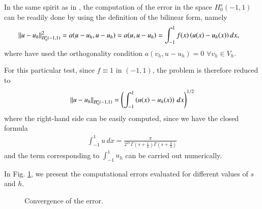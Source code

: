 In the same spirit as in \cite{acosta2017short}, the computation of the error in the space $H_0^s(-1,1)$ can be readily done by using the definition of the bilinear form, namely
\begin{align*}
	{\left\|u-u_h\right\|}_{H_0^s(-1,1)}^2 &=a(u-u_h,u-u_h) =a(u,u-u_h) =\int_{-1}^1f(x)\left(u(x)-u_h(x)\right)dx,
\end{align*}
where have used the orthogonality condition $a(v_h,u-u_h)=0$ $\forall v_h \in V_h$.

For this particular test, since $f\equiv 1$ in $(-1,1)$, the problem is therefore reduced to
\begin{align*}
	{\left\|u-u_h\right\|}_{H^s_0(-1,1)}=\left(\int_{-1}^1\left( u(x)-u_h(x) \right)\,dx\right)^{1/2}
\end{align*}
where the right-hand side can be easily computed, since we have the closed formula 
\begin{align*}
	\int_{-1}^1u\,dx= \frac{\pi}{2^{2s}\Gamma(s+\frac{1}{2})\Gamma(s+\frac{3}{2})}
\end{align*}
and the term corresponding to $\int_{-1}^1u_h$ can be carried out numerically. 

In Fig.  \ref{error}, we present the computational errors evaluated for different values of $s$ and $h$. 
\begin{figure}[!h]
 \centering
%
\caption{Convergence of the error.}
\label{error}
\end{figure}

